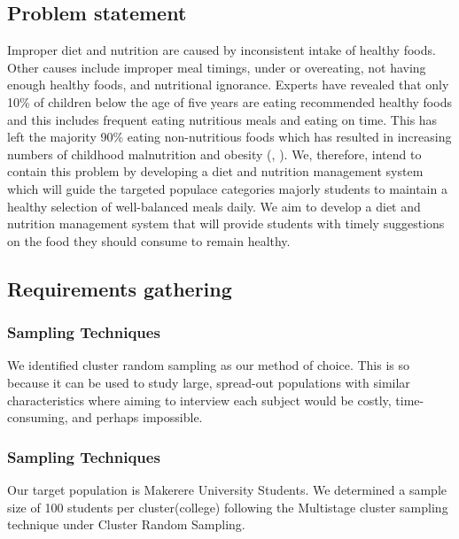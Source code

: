 \documentclass{article}
\begin{document}
\subsection{Problem statement}
Improper diet and nutrition are caused by inconsistent intake of healthy foods. Other causes include improper meal timings, under or overeating, not having enough healthy foods, and nutritional ignorance. Experts have revealed that only 10\% of children below the age of five years are eating recommended healthy foods and this includes frequent eating nutritious meals and eating on time. This has left the majority 90\% eating non-nutritious foods which has resulted in increasing numbers of childhood malnutrition and obesity (\citeauthor{tumwine2022only}, \citeyear{tumwine2022only}). We, therefore, intend to contain this problem by developing a diet and nutrition management system which will guide the targeted populace categories majorly students to maintain a healthy selection of well-balanced meals daily. We aim to develop a diet and nutrition management system that will provide students with timely suggestions on the food they should consume to remain healthy.

\subsection{Requirements gathering}
\subsubsection{Sampling Techniques}
We identified cluster random sampling as our method of choice. This is so because it can be used to study large, spread-out populations with similar characteristics where aiming to interview each subject would be costly, time-consuming, and perhaps impossible.

\subsubsection{Sampling Techniques}
Our target population is Makerere University Students.  We determined a sample size of 100 students per cluster(college) following the Multistage cluster sampling technique under Cluster Random Sampling.
\end{document}
